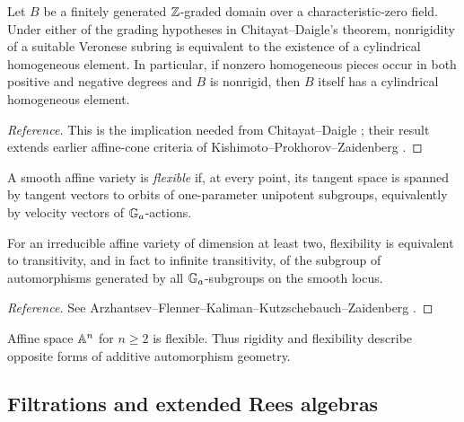 \begin{recalledtheorem}\label{thm:graded-cylindricity}
Let $B$ be a finitely generated $\mathbb Z$-graded domain over a characteristic-zero field.  Under either of the grading hypotheses in Chitayat--Daigle's theorem, nonrigidity of a suitable Veronese subring is equivalent to the existence of a cylindrical homogeneous element.  In particular, if nonzero homogeneous pieces occur in both positive and negative degrees and $B$ is nonrigid, then $B$ itself has a cylindrical homogeneous element.
\end{recalledtheorem}

\begin{proof}[Reference]
This is the implication needed from Chitayat--Daigle \cite[Theorem 1.2(1)]{ChitayatDaigle2024}; their result extends earlier affine-cone criteria of Kishimoto--Prokhorov--Zaidenberg \cite{KishimotoProkhorovZaidenberg2013}.
\end{proof}

\begin{definition}[Flexibility]\label{def:flexibility}
A smooth affine variety is \emph{flexible} if, at every point, its tangent space is spanned by tangent vectors to orbits of one-parameter unipotent subgroups, equivalently by velocity vectors of $\mathbb G_a$-actions.
\end{definition}

\begin{recalledtheorem}\label{thm:flexibility}
For an irreducible affine variety of dimension at least two, flexibility is equivalent to transitivity, and in fact to infinite transitivity, of the subgroup of automorphisms generated by all $\mathbb G_a$-subgroups on the smooth locus.
\end{recalledtheorem}

\begin{proof}[Reference]
See Arzhantsev--Flenner--Kaliman--Kutzschebauch--Zaidenberg \cite[Theorem 0.1]{ArzhantsevEtAl2013}.
\end{proof}

\begin{remark}\label{rem:affine-space-flexible}
Affine space $\mathbb A^n$ for $n\geq2$ is flexible.  Thus rigidity and flexibility describe opposite forms of additive automorphism geometry.
\end{remark}

\subsection{Filtrations and extended Rees algebras}

